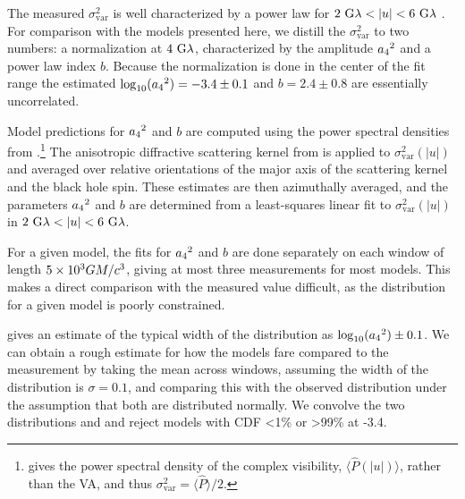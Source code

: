 
The measured $\sigma_\text{var}^2$ is well characterized by a power law for $2~{\rm G}\lambda < |u| < 6~{\rm G}\lambda$ \citep{Georgiev_2022}.  For comparison with the models presented here, we distill the $\sigma_{\text{var}}^2$ to two numbers: a normalization at $4~{\rm G}\lambda$, characterized by the amplitude ${a_4}^2$ and a power law index $b$.  Because the normalization is done in the center of the fit range the estimated $\log_{10}({a_4}^2) = -3.4 \pm 0.1$ and $b=2.4\pm0.8$ are essentially uncorrelated.

Model predictions for ${a_4}^2$ and $b$ are computed using the power spectral densities from \citet{Georgiev_2022}.\footnote{\citet{Georgiev_2022} gives the power spectral density of the complex visibility, $\langle\hat{P}(|u|)\rangle$, rather than the VA, and thus $\sigma_\text{var}^2=\langle \hat{P}\rangle/2$. } The anisotropic diffractive scattering kernel from \citet{Johnson_2018} is applied to $\sigma_\text{var}^2(|u|)$ and averaged over relative orientations of the major axis of the scattering kernel and the black hole spin.  These estimates are then azimuthally averaged, and the parameters ${a_4}^2$ and $b$ are determined from a least-squares linear fit to $\sigma_\text{var}^2(|u|)$ in $2~{\rm G}\lambda < |u| < 6~{\rm G}\lambda$.

For a given model, the fits for ${a_4}^2$ and $b$ are done separately on each window of length $5 \times 10^3 GM/c^3$, giving at most three measurements for most models. This makes a direct comparison with the measured value difficult, as the distribution for a given model is poorly constrained.

\citet{Georgiev_2022} gives an estimate of the typical width of the distribution as $\log_{10}({a_4}^2) \pm 0.1$. We can obtain a rough estimate for how the models fare compared to the measurement by taking the mean across windows, assuming the width of the distribution is $\sigma = 0.1$, and comparing this with the observed distribution under the assumption that both are distributed normally. We convolve the two distributions and and reject models with CDF <1\% or >99\% at -3.4.
